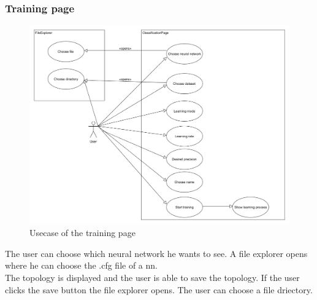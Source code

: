 \documentclass[parskip=full]{scrartcl}
\begin{document}
\subsubsection{Training page}
\begin{figure}[htb!]
\centering
\includegraphics[width=\textwidth]{TrainUsecase}
\caption{Usecase of the training page}
\end{figure}
The user can choose which neural network he wants to see. 
A file explorer opens where he can choose the .cfg file of a \gls{nn}.
\\The topology is displayed and the user is able to save the topology.
If the user clicks the save button the file explorer opens. The user can choose a file driectory.
\clearpage
\end{document}
